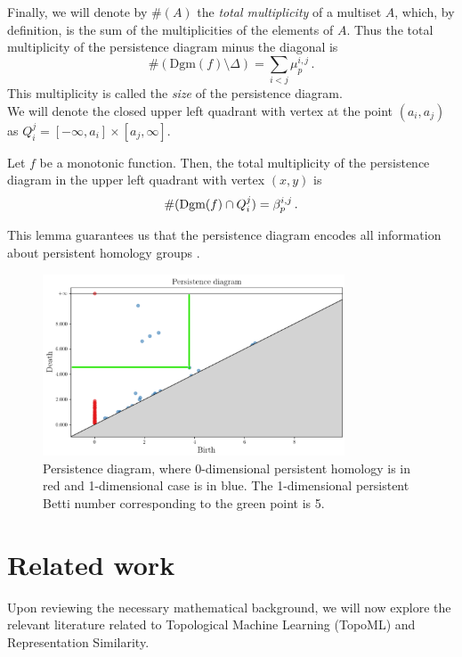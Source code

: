 \documentclass[../main.tex]{subfiles}
\begin{document}
Finally, we will denote by $\#(A)$ the \emph{total multiplicity} of a multiset $A$, which, by definition, is the sum of the multiplicities of the elements of $A$. Thus the total multiplicity of the persistence diagram minus the diagonal is
\[
\#(\text{Dgm}(f) \setminus \Delta) = \sum_{i < j} \mu_p^{i, j}\,.
\]
This multiplicity is called the \emph{size} of the persistence diagram.\\

We will denote the closed upper left quadrant with vertex at the point $(a_i, a_j)$ as $Q_{i}^{j} = [-\infty, a_i] \times [a_j, \infty]$.

\begin{lemma}
Let $f$ be a monotonic function. Then, the total multiplicity of the persistence diagram in the upper left quadrant with vertex $(x, y)$ is
\[
\#(\text{\rm Dgm}(f) \cap Q_{i}^{j})= \beta_p^{i,j}\,.
\]
\end{lemma}

This lemma guarantees us that the persistence diagram encodes all information about persistent homology groups \cite[Chapter~7]{edelsbrunner_computational_2010}.

\begin{figure}[!ht]
\centering
\includegraphics[width=0.8\textwidth]{figures/bg/persistenceEx.png} 
\caption{Persistence diagram, where 0-dimensional persistent homology is in red and 1-dimensional case is in blue. The 1-dimensional persistent Betti number corresponding to the green point is 5.}
\label{fig:persEx}
\end{figure}


\section{Related work}
Upon reviewing the necessary mathematical background, we will now explore the relevant literature related to Topological Machine Learning (TopoML) and Representation Similarity.
\end{document}
